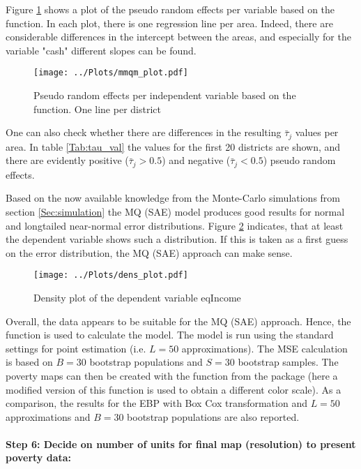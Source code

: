 Figure \ref{Fig:mmqm_plots} shows a plot of the pseudo random effects per variable based on the  function. In each plot, there is one regression line per area. Indeed, there are considerable differences in the intercept between the areas, and especially for the variable "cash" different slopes can be found. 
\begin{figure}[H]
\center
\texttt{[image: ../Plots/mmqm\_plot.pdf]}
\caption{Pseudo random effects per independent variable based on the  function. One line per district}
\label{Fig:mmqm_plots}
\end{figure}

One can also check whether there are differences in the resulting ${\bar\tau_j}$ values per area. In table \ref{Tab:tau_val} the values for the first 20 districts are shown, and there are evidently positive ($\bar{\tau}_j >0.5$) and negative ($\bar{\tau}_j <0.5$) pseudo random effects.

\label{Tab:tau_val}

Based on the now available knowledge from the Monte-Carlo simulations from section \ref{Sec:simulation} the MQ (SAE) model produces good results for normal and longtailed near-normal error distributions. Figure \ref{Fig:dens} indicates, that at least the dependent variable shows such a distribution. If this is taken as a first guess on the error distribution, the MQ (SAE) approach can make sense. 

\begin{figure}[H]
\center
\texttt{[image: ../Plots/dens\_plot.pdf]}
\caption{Density plot of the dependent variable eqIncome}
\label{Fig:dens}
\end{figure}

Overall, the data appears to be suitable for the MQ (SAE) approach. Hence, the   function is used to calculate the model. 
The model is run using the standard settings for point estimation (i.e. $L=50$ approximations). The MSE calculation is based on   $B=30$ bootstrap populations and $S=30$ bootstrap samples.
The poverty maps can  then be created with the  function from the  package (here a modified version of this function is used to obtain a different color scale). 
As a comparison, the results for the EBP with Box Cox transformation and $L=50$ approximations and  $B=30$ bootstrap populations are also reported.

\paragraph{Step 6:  Decide on number of units for final map (resolution) to present poverty data:}

